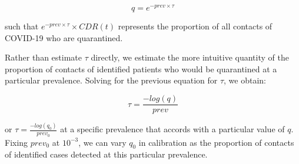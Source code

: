 \[q = e^{-prev \times \tau }\]

such that \(e^{-prev \times \tau} \times CDR(t) \) represents the proportion of all contacts of COVID-19 who are quarantined.

Rather than estimate \(\tau\) directly, we estimate the more intuitive quantity of the proportion of contacts of identified patients who would be quarantined at a particular prevalence.
Solving for the previous equation for \(\tau\), we obtain:

\[\tau = \frac{-log(q)}{prev} \]

or \(\tau = \frac{-log(q_{0})}{prev_{0}} \) at a specific prevalence that accords with a particular value of \(q\). Fixing \(prev_{0}\) at \(10^{-3}\), we can vary \(q_{0}\) in calibration as the proportion of contacts of identified cases detected at this particular prevalence.

